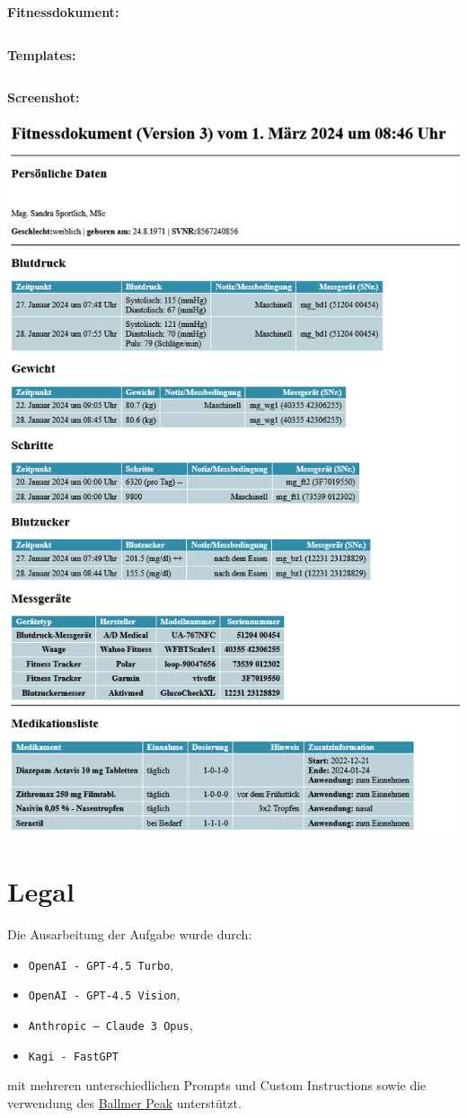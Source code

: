 \documentclass[a4paper,11pt]{report}
\begin{document}
\textbf{Fitnessdokument:}
\inputminted[frame=lines, breaklines, linenos]{xslt}{assets/fitnessdokument.xslt}

\textbf{Templates:}
\inputminted[frame=lines, breaklines, linenos]{xslt}{assets/templates.xslt}

\textbf{Screenshot:}
\begin{center}
    \includegraphics[width=\textwidth, height=\textheight]{assets/XSLOutput.png}
\end{center}

\newpage

\chapter{Legal}
Die Ausarbeitung der Aufgabe wurde durch:
\begin{itemize}
    \item \texttt{OpenAI - GPT-4.5 Turbo}, 
    \item \texttt{OpenAI - GPT-4.5 Vision}, 
    \item \texttt{Anthropic -- Claude 3 Opus}, 
    \item \texttt{Kagi - FastGPT}
\end{itemize}
mit mehreren unterschiedlichen Prompts und Custom Instructions sowie die verwendung des \href{https://xkcd.com/323/}{Ballmer Peak} unterstützt.
\end{document}
